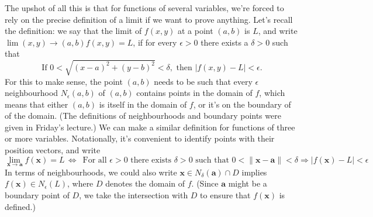 \documentclass[letterpaper,12pt]{article}
\newcommand{\aaa}{\mathbf{a}}
\newcommand{\abs}[1]{\lvert #1\rvert}
\newcommand{\len}[1]{\lVert #1\rVert}
\newcommand{\x}{\mathbf{x}}
\newcommand{\di}{\displaystyle}
\begin{document}
The upshot of all this is that for functions of several variables, we're forced to rely on the precise definition of a limit if we want to prove anything. Let's recall the definition: we say that the limit of $f(x,y)$ at a point $(a,b)$ is $L$, and write $\di \lim{(x,y)\to(a,b)}f(x,y)=L$, if for every $\epsilon>0$ there exists a $\delta>0$ such that 
\[
 \text{If } 0<\sqrt{(x-a)^2+(y-b)^2}<\delta, \text{ then } \abs{f(x,y)-L}<\epsilon.
\]
For this to make sense, the point $(a,b)$ needs to be such that every $\epsilon$ neighbourhood $N_\epsilon(a,b)$ of $(a,b)$ contains points in the domain of $f$, which means that either $(a,b)$ is itself in the domain of $f$, or it's on the boundary of of the domain. (The definitions of neighbourhoods and boundary points were given in Friday's lecture.) We can make a similar definition for functions of three or more variables. Notationally, it's convenient to identify points with their position vectors, and write
\[
 \lim_{\x\to\aaa}f(\x)=L \,\Leftrightarrow\, \text{ For all } \epsilon>0 \text{ there exists } \delta>0 \text{ such that } 0<\len{\x-\aaa}<\delta \Rightarrow \abs{f(\x)-L}<\epsilon
\]
In terms of neighbourhoods, we could also write $\x\in N_\delta(\aaa)\cap D$ implies $f(\x)\in N_\epsilon(L)$, where $D$ denotes the domain of $f$. (Since $\aaa$ might be a boundary point of $D$, we take the intersection with $D$ to ensure that $f(\x)$ is defined.)

\medskip
\end{document}
